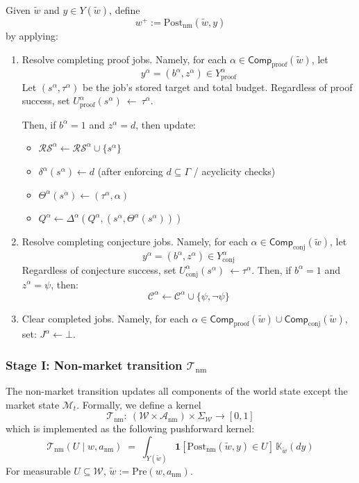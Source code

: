 \documentclass[letterpaper]{article} %
\begin{document}
Given $\tilde w$ and $y\in Y(\tilde w)$, define
\[w^+ := \mathrm{Post}_{\mathrm{nm}}(\tilde w,y)\]
by applying:
\begin{enumerate}
    \item Resolve completing proof jobs. Namely, for each $\alpha\in\mathsf{Comp}_{\mathrm{proof}}(\tilde w)$, let
\[y^\alpha = (b^\alpha, z^\alpha)\in Y^\alpha_{\mathrm{proof}}\]
Let $(s^\alpha,\tau^\alpha)$ be the job’s stored target and total budget. Regardless of proof success, set $U^\alpha_{\mathrm{proof}}(s^\alpha)\ \leftarrow\ \tau^\alpha$.

Then, if $b^\alpha=1$ and $z^\alpha=d$, then update:
\begin{itemize}
    \item	$\mathcal{RS}^\alpha \leftarrow \mathcal{RS}^\alpha \cup \{s^\alpha\}$
	\item	$\delta^\alpha(s^\alpha) \leftarrow d$ (after enforcing $d\subseteq \Gamma$ / acyclicity checks)
	\item	$\Theta^\alpha(s^\alpha)\leftarrow (\tau^\alpha,\alpha)$
	\item	$Q^\alpha \leftarrow \Delta^\alpha(Q^\alpha,(s^\alpha,\Theta^\alpha(s^\alpha)))$
\end{itemize}
	\item Resolve completing conjecture jobs. Namely, for each $\alpha\in\mathsf{Comp}_{\mathrm{conj}}(\tilde w)$, let
\[y^\alpha = (b^\alpha, z^\alpha)\in Y^\alpha_{\mathrm{conj}}\]
Regardless of conjecture success, set $U^\alpha_{\mathrm{conj}}(s^\alpha)\ \leftarrow\tau^\alpha$. Then, if $b^\alpha=1$ and $z^\alpha=\psi$, then:
\[\mathcal C^\alpha \leftarrow \mathcal C^\alpha \cup \{\psi,\neg\psi\}\]
\item Clear completed jobs. Namely, for each $\alpha\in \mathsf{Comp}_{\mathrm{proof}}(\tilde w)\cup \mathsf{Comp}_{\mathrm{conj}}(\tilde w)$, set:
$J^\alpha \leftarrow \bot$.

\end{enumerate}



\subsubsection{Stage I: Non-market transition $\mathcal{T}_{\mathrm{nm}}$}

The non-market transition updates all components of the world state except the market state $\mathcal{M}_t$.
Formally, we define a kernel
\[
\mathcal{T}_{\mathrm{nm}}:\ (\mathcal{W}\times \mathcal{A}_{\mathrm{nm}})\times \Sigma_{\mathcal{W}}\to[0,1]
\]
which is implemented as the following pushforward kernel:
\[\mathcal T_{\mathrm{nm}}(U\mid w,a_{\mathrm{nm}})
\;=\;
\int_{Y(\widetilde w)}
\mathbf 1\!\left[\mathrm{Post}_{\mathrm{nm}}(\widetilde w,y)\in U\right]\,
\mathbb K_{\widetilde w}(dy)\]
For measurable $U\subseteq \mathcal W$, $\widetilde w:=\mathrm{Pre}(w,a_{\mathrm{nm}})$.
\end{document}

